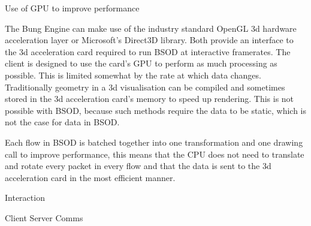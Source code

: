 Use of GPU to improve performance

The Bung Engine can make use of the industry standard OpenGL 3d hardware
acceleration layer or Microsoft's Direct3D library. Both provide an interface
to the 3d acceleration card required to run BSOD at interactive framerates.
The client is designed to use the card's GPU to perform as much processing as
possible. This is limited somewhat by the rate at which data changes.
Traditionally geometry in a 3d visualisation can be compiled and sometimes
stored in the 3d acceleration card's memory to speed up rendering. This is not
possible with BSOD, because such methods require the data to be static, which
is not the case for data in BSOD.

Each flow in BSOD is batched together into one transformation and one drawing
call to improve performance, this means that the CPU does not need to
translate and rotate every packet in every flow and that the data is sent to
the 3d acceleration card in the most efficient manner.


Interaction

Client Server Comms


